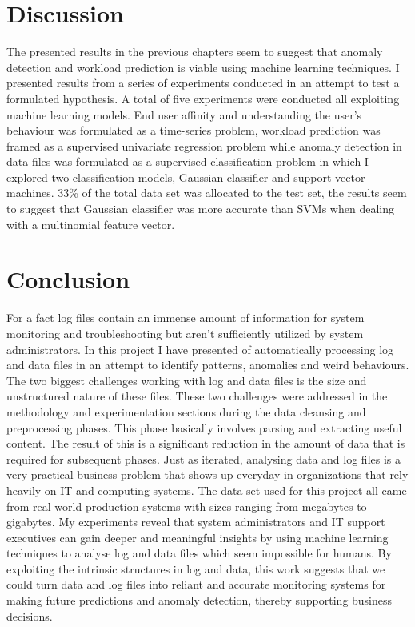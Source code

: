 \documentclass[12pt, letterpaper, titlepage]{report}
\begin{document}
\section{Discussion}
The presented results in the previous chapters seem to suggest that anomaly detection and workload prediction is viable using machine learning techniques. I presented results from a series of experiments conducted in an attempt to test a formulated hypothesis. A total of five experiments were conducted all exploiting machine learning models. End user affinity and understanding the user’s behaviour  was formulated as a time-series problem, workload prediction was framed as a supervised univariate regression problem while anomaly detection in data files was formulated as a supervised classification problem in which I explored two classification models, Gaussian classifier and support vector machines. 33\% of the total data set was allocated to the test set, the results seem to suggest that Gaussian classifier was more accurate than SVMs when dealing with a multinomial feature vector.  
\section{Conclusion}
For a fact log files contain an immense amount of information for system monitoring and troubleshooting but aren’t sufficiently utilized by system administrators. In this project I have presented of automatically processing log and data files in an attempt to identify patterns, anomalies and weird behaviours. The two biggest challenges working with log and data files is the size and unstructured nature of these files. These two challenges were addressed in the methodology and experimentation sections during the data cleansing and preprocessing phases. This phase basically involves parsing and extracting useful content. The result of this is a significant reduction in the amount of data that is required for subsequent phases. Just as \cite{xu2010system} iterated, analysing data and log files is a very practical business problem that shows up everyday in organizations that rely heavily on IT and computing systems. The data set used for this project all came from real-world production systems with sizes ranging from megabytes to gigabytes. 
My experiments reveal that system administrators and IT support executives can gain deeper and meaningful insights by using machine learning techniques to analyse log and data files which seem impossible for humans. By exploiting the intrinsic structures in log and data, this work suggests that we could turn data and log files into reliant and accurate monitoring systems for making future predictions and anomaly detection, thereby supporting business decisions.



\end{document}
